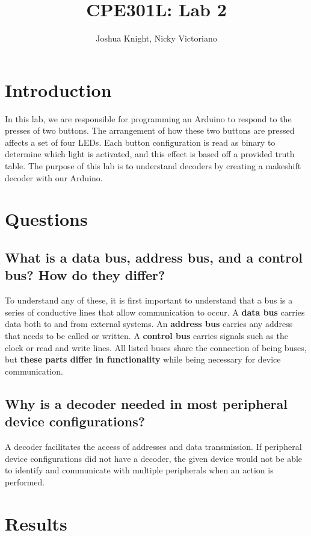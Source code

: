 \documentclass{article}
\title{CPE301L: Lab 2}
\author{Joshua Knight, Nicky Victoriano}
\begin{document}
\maketitle

\section{Introduction}

In this lab, we are responsible for programming an Arduino to respond to the presses of two buttons. The arrangement of how these two buttons are pressed affects a set of four LEDs. Each button configuration is read as binary to determine which light is activated, and this effect is based off a provided truth table. The purpose of this lab is to understand decoders by creating a makeshift decoder with our Arduino.

\section{Questions}

\subsection{What is a data bus, address bus, and a control bus? How do they differ?}

To understand any of these, it is first important to understand that a bus is a series of conductive lines that allow communication to occur. A \textbf{data bus} carries data both to and from external systems. An \textbf{address bus} carries any address that needs to be called or written. A \textbf{control bus} carries signals such as the clock or read and write lines. All listed buses share the connection of being buses, but \textbf{ these parts differ in functionality} while being necessary for device communication.

\subsection{Why is a decoder needed in most peripheral device configurations?}

A decoder facilitates the access of addresses and data transmission. If peripheral device configurations did not have a decoder, the given device would not be able to identify and communicate with multiple peripherals when an action is performed.

\section{Results}
\end{document}
